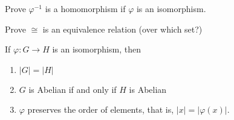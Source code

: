 \documentclass[11pt,a4paper]{article}
\begin{document}
\begin{eje}
    Prove \(\varphi^{-1}\) is a homomorphism if \(\varphi\) is an isomorphism.
\end{eje}

\begin{eje}
    Prove \(\cong\) is an equivalence relation (over which set?)
\end{eje}


\begin{lem}\label{lem:facts.pf.group.isomorphism}
    If \(\varphi\colon G\to H\) is an isomorphism, then 
    \begin{enumerate}[label=(\roman*)]
        \item \(|G| = |H|\)
        \item \(G\) is Abelian if and only if \(H\) is Abelian
        \item \(\varphi\) preserves the order of elements, that is, \(|x| = |\varphi(x)|\).
    \end{enumerate}
\end{lem}
\end{document}
